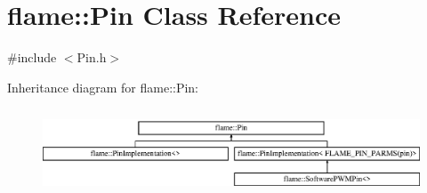 \hypertarget{classflame_1_1_pin}{\section{flame\-:\-:Pin Class Reference}
\label{classflame_1_1_pin}
}


{\ttfamily \#include $<$Pin.\-h$>$}

Inheritance diagram for flame\-:\-:Pin\-:\begin{figure}[H]
\begin{center}
\leavevmode
\includegraphics[height=2.616822cm]{classflame_1_1_pin}
\end{center}
\end{figure}
